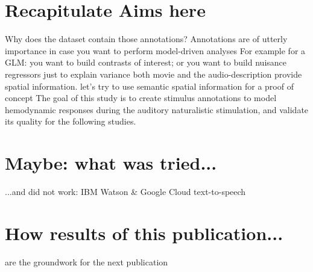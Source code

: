 
\section{Recapitulate Aims here}
%
Why does the dataset contain those annotations? Annotations are of utterly
importance in case you want to perform model-driven analyses
%
For example for a GLM: you want to build contrasts of interest; or you want to
build nuisance regressors just to explain variance
%
both movie and the audio-description provide spatial information.
%
let's try to use semantic spatial information for a proof of concept
%
The goal of this study is to create stimulus annotations to model hemodynamic
responses during the auditory naturalistic stimulation, and validate its quality
for the following studies.


\section{Maybe: what was tried...}

...and did not work: IBM Watson \& Google Cloud text-to-speech

\section{How results of this publication...}

are the groundwork for the next publication
